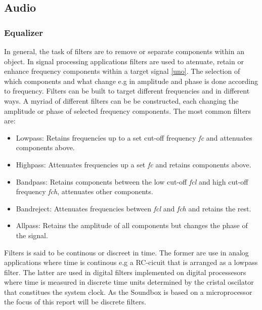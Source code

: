 \documentclass[12p]{article}
\begin{document}
\subsection{Audio}
\label{Theory:Audio}

\subsubsection{Equalizer}

In general, the task of filters are to remove or separate components within an object. In signal processing applications filters are used to atenuate, retain or enhance frequency components within a target signal \ref{uno}. The selection of which components and what change e.g in amplitude and phase is done according to frequency. Filters can be built to target different frequencies and in different ways. A myriad of different filters can be be constructed, each changing the amplitude or phase of selected frequency components. The most common filters are:

\begin{itemize}
\item Lowpass: Retains frequencies up to a set cut-off frequency \emph{fc} and attenuates components above.
\item Highpass: Attenuates frequencies up a set \emph{fc} and retains components above.
\item Bandpass: Retains components between the low cut-off \emph{fcl} and high cut-off frequency \emph{fch}, attenuates other components.
\item Bandreject: Attenuates frequencies between \emph{fcl} and \emph{fch} and retains the rest.
\item Allpass: Retains the amplitude of all components but changes the phase of the signal.
\end{itemize}

Filters is said to be continous or discreet in time. The former are use in analog applications where time is continous e.g a RC-cicuit that is arranged as a lowpass filter. The latter are used in digital filters implemented on digital processesors where time is measured in discrete time units determined by the cristal oscilator that constitues the system clock. As the Soundbox is based on a microprocessor the focus of this report will be discrete filters.
\end{document}
